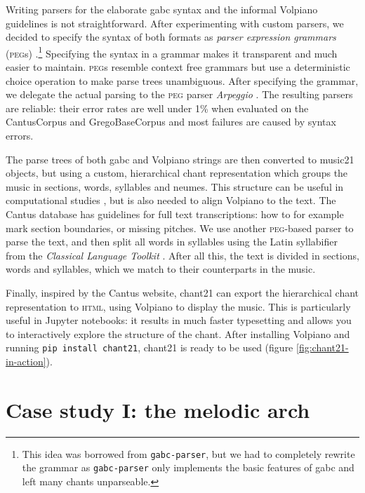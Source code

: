 \documentclass[sigconf,screen]{acmart}
\begin{document}
Writing parsers for the elaborate gabc syntax and the informal Volpiano guidelines is not straightforward.
After experimenting with custom parsers, we decided to specify the syntax of both formats as \emph{parser expression grammars} (\textsc{peg}s) \cite{Ford2004}.\footnote{%
    This idea was borrowed from \texttt{gabc-parser}, but we had to completely rewrite the grammar as \texttt{gabc-parser} only implements the basic features of gabc and left many chants unparseable.}
Specifying the syntax in a grammar makes it transparent and much easier to maintain.
\textsc{peg}s resemble context free grammars but use a deterministic choice operation to make parse trees unambiguous.
After specifying the grammar, we delegate the actual parsing to the \textsc{peg} parser \emph{Arpeggio} \cite{Dejanovic2016}.
The resulting parsers are reliable: their error rates are well under 1\% when evaluated on the CantusCorpus and Grego\-BaseCorpus and most failures are caused by syntax errors.


The parse trees of both gabc and Volpiano strings are then converted to music21 objects, but using a custom, hierarchical chant representation which groups the music in sections, words, syllables and neumes.
This structure can be useful in computational studies \cite{Cornelissen2020}, but is also needed to align Volpiano to the text.
The Cantus database has guidelines for full text transcriptions: how to for example mark section boundaries, or missing pitches.
We use another \textsc{peg}-based parser to parse the text, and then split all words in syllables using the Latin syllabifier from the \emph{Classical Language Toolkit} \cite{johnson2014}.
After all this, the text is divided in sections, words and syllables, which we match to their counterparts in the music.


Finally, inspired by the Cantus website, chant21 can export the hierarchical chant representation to \textsc{html}, using Volpiano to display the music.
This is particularly useful in Jupyter notebooks: it results in much faster typesetting and allows you to interactively explore the structure of the chant.
After installing Volpiano and running \texttt{pip install chant21}, chant21 is ready to be used (figure \ref{fig:chant21-in-action}).




\section{Case study I: the melodic arch}
\end{document}
